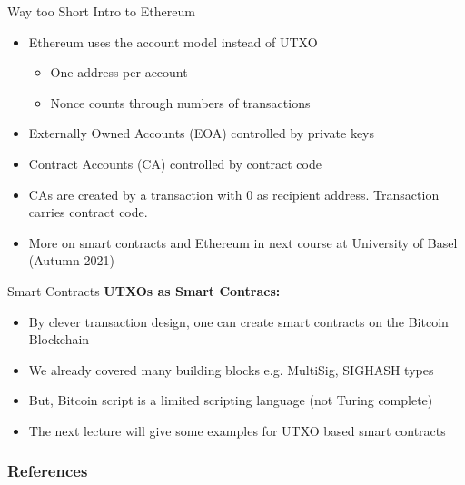 \documentclass[]{beamer}
\begin{document}

\begin{frame}{Way too Short Intro to Ethereum}
	\begin{itemize}
		\item<1 ->Ethereum uses the account model instead of UTXO
		\begin{itemize}
			\item<1 ->One address per account
			\item<2 ->Nonce counts through numbers of transactions
		\end{itemize}
		\item<3 ->Externally Owned Accounts (EOA) controlled by private keys
		\item<4 ->Contract Accounts (CA) controlled by contract code
		\item<5 ->CAs are created by a transaction with 0 as recipient address. Transaction carries contract code.
		\item<6 ->More on smart contracts and Ethereum in next course at University of Basel (Autumn 2021)
	\end{itemize}
\end{frame}


\begin{frame}{Smart Contracts}
	\textbf{UTXOs as Smart Contracs:}
	\begin{itemize}
		\item<1-> By clever transaction design, one can create smart contracts on the Bitcoin Blockchain
		\item<2-> We already covered many building blocks e.g. MultiSig, SIGHASH types
		\item<3-> But, Bitcoin script is a limited scripting language (not Turing complete)
		\item<4-> The next lecture will give some examples for UTXO based smart contracts
	\end{itemize}
\end{frame}


\begin{frame}%
	\frametitle{References}
	
	
\end{frame}

\end{document}
